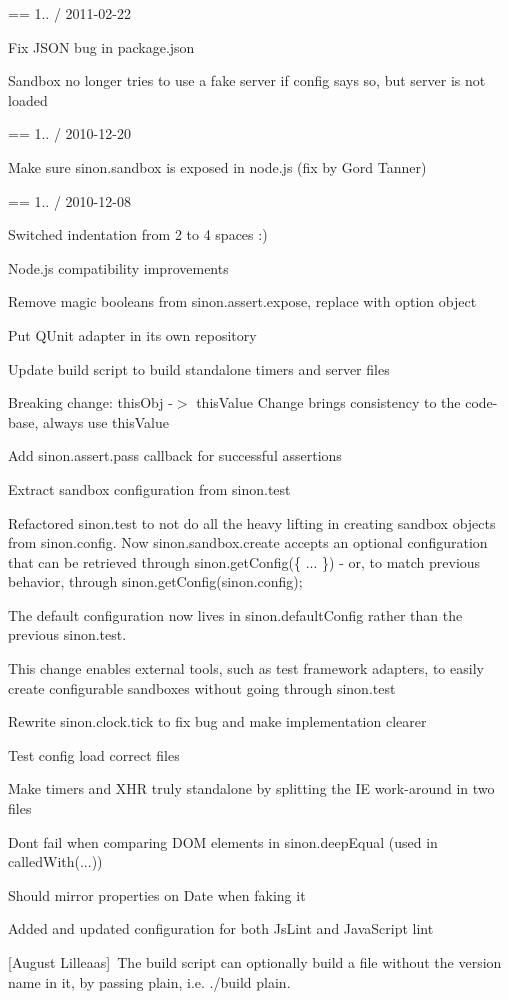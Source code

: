 == 1.. / 2011-\/02-\/22
\begin{DoxyItemize}
\item Fix J\+S\+ON bug in package.\+json
\item Sandbox no longer tries to use a fake server if config says so, but server is not loaded
\end{DoxyItemize}

== 1.. / 2010-\/12-\/20
\begin{DoxyItemize}
\item Make sure sinon.\+sandbox is exposed in node.\+js (fix by Gord Tanner)
\end{DoxyItemize}

== 1.. / 2010-\/12-\/08
\begin{DoxyItemize}
\item Switched indentation from 2 to 4 spaces \+:)
\item Node.\+js compatibility improvements
\item Remove magic booleans from sinon.\+assert.\+expose, replace with option object
\item Put Q\+Unit adapter in its own repository
\item Update build script to build standalone timers and server files
\item Breaking change\+: this\+Obj -\/$>$ this\+Value Change brings consistency to the code-\/base, always use this\+Value
\item Add sinon.\+assert.\+pass callback for successful assertions
\item Extract sandbox configuration from sinon.\+test

Refactored sinon.\+test to not do all the heavy lifting in creating sandbox objects from sinon.\+config. Now sinon.\+sandbox.\+create accepts an optional configuration that can be retrieved through sinon.\+get\+Config(\{ ... \}) -\/ or, to match previous behavior, through sinon.\+get\+Config(sinon.\+config);

The default configuration now lives in sinon.\+default\+Config rather than the previous sinon.\+test.

This change enables external tools, such as test framework adapters, to easily create configurable sandboxes without going through sinon.\+test
\item Rewrite sinon.\+clock.\+tick to fix bug and make implementation clearer
\item Test config load correct files
\item Make timers and X\+HR truly standalone by splitting the IE work-\/around in two files
\item Don\textquotesingle{}t fail when comparing D\+OM elements in sinon.\+deep\+Equal (used in called\+With(...))
\item Should mirror properties on Date when faking it
\item Added and updated configuration for both Js\+Lint and Java\+Script lint
\item \mbox{[}August Lilleaas\mbox{]} \+The build script can optionally build a file without the version name in it, by passing \textquotesingle{}plain\textquotesingle{}, i.\+e. \textquotesingle{}./build plain\textquotesingle{}.


\end{DoxyItemize}
